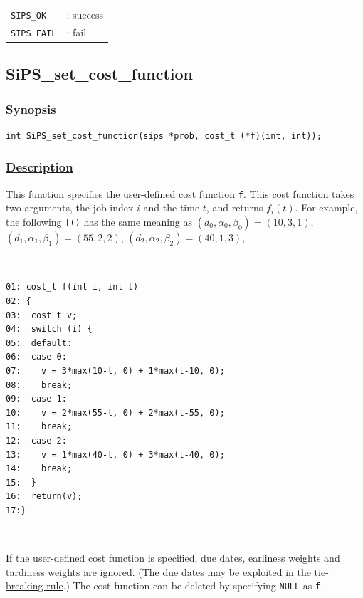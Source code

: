 \documentclass[a4paper]{book}
\newenvironment{fminipage}%
{\begin{Sbox}\begin{minipage}}{\end{minipage}\end{Sbox}\fbox{\TheSbox}}
\begin{document}
\begin{tabular}{ll}
  \verb+SIPS_OK+  &: success\\
  \verb+SIPS_FAIL+&: fail\\
\end{tabular}

\hypertarget{SiPS_set_cost_function}{%
\subsection{SiPS\_set\_cost\_function}
}

\subsubsection{\underline{Synopsis}}

\begin{verbatim}
int SiPS_set_cost_function(sips *prob, cost_t (*f)(int, int));
\end{verbatim}

\subsubsection{\underline{Description}}

This function specifies the user-defined cost function \verb+f+.
This cost function takes two arguments, the job index $i$ and the time $t$, and returns $f_i(t)$.
For example, the following \verb+f()+ has the same meaning as $(d_0,\alpha_0,\beta_0)=(10, 3, 1)$, $(d_1,\alpha_1,\beta_1)=(55, 2, 2)$, $(d_2,\alpha_2,\beta_2)=(40, 1, 3)$,

\begin{center}
    \begin{fminipage}[t]{0.96\textwidth}
    \mbox{}\\[-15pt]
    \begin{verbatim}
01: cost_t f(int i, int t)
02: {
03:  cost_t v;
04:  switch (i) {
05:  default:
06:  case 0:
07:    v = 3*max(10-t, 0) + 1*max(t-10, 0);
08:    break;
09:  case 1:
10:    v = 2*max(55-t, 0) + 2*max(t-55, 0);
11:    break;
12:  case 2:
13:    v = 1*max(40-t, 0) + 3*max(t-40, 0);
14:    break;
15:  }
16:  return(v);
17:}
    \end{verbatim}
    \mbox{}\\[-32pt]
  \end{fminipage}
\end{center}

If the user-defined cost function is specified, due dates, earliness weights and tardiness weights are ignored.
(The due dates may be exploited in \hyperlink{TIEBREAK}{the tie-breaking rule}.)
The cost function can be deleted by specifying \verb+NULL+ as \verb+f+.
\end{document}
